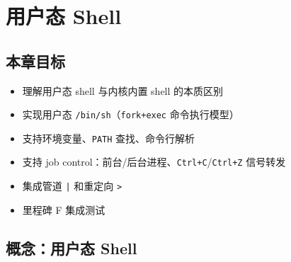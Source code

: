 \chapter{用户态 Shell}
\label{ch:user-shell}

\section{本章目标}

\begin{itemize}
  \item 理解用户态 shell 与内核内置 shell 的本质区别
  \item 实现用户态 \texttt{/bin/sh}（\texttt{fork+exec} 命令执行模型）
  \item 支持环境变量、\texttt{PATH} 查找、命令行解析
  \item 支持 job control：前台/后台进程、\texttt{Ctrl+C}/\texttt{Ctrl+Z} 信号转发
  \item 集成管道 \texttt{|} 和重定向 \texttt{>}
  \item 里程碑 F 集成测试
\end{itemize}

\section{概念：用户态 Shell}
\label{sec:ush-concept}


